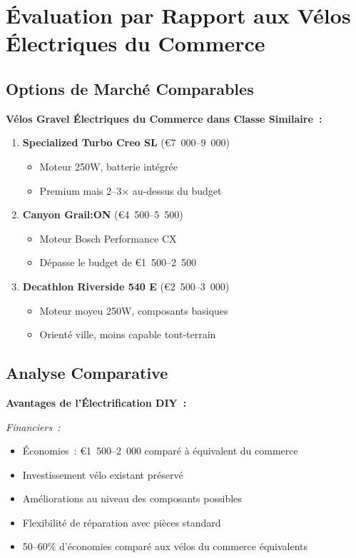 \documentclass[12pt,a4paper]{article}
\begin{document}
\section{Évaluation par Rapport aux Vélos Électriques du Commerce}

\subsection{Options de Marché Comparables}

\textbf{Vélos Gravel Électriques du Commerce dans Classe Similaire~:}

\begin{enumerate}
    \item \textbf{Specialized Turbo Creo SL} (€7~000--9~000) \cite{specialized-turbo}
    \begin{itemize}
        \item Moteur 250W, batterie intégrée
        \item Premium mais 2--3× au-dessus du budget
    \end{itemize}
    
    \item \textbf{Canyon Grail:ON} (€4~500--5~500) \cite{canyon-grail}
    \begin{itemize}
        \item Moteur Bosch Performance CX
        \item Dépasse le budget de €1~500--2~500
    \end{itemize}
    
    \item \textbf{Decathlon Riverside 540 E} (€2~500--3~000) \cite{decathlon-riverside}
    \begin{itemize}
        \item Moteur moyeu 250W, composants basiques
        \item Orienté ville, moins capable tout-terrain
    \end{itemize}
\end{enumerate}

\subsection{Analyse Comparative}

\textbf{Avantages de l'Électrification DIY~:}

\textit{Financiers~:}
\begin{itemize}
    \item Économies~: €1~500--2~000 comparé à équivalent du commerce
    \item Investissement vélo existant préservé
    \item Améliorations au niveau des composants possibles
    \item Flexibilité de réparation avec pièces standard
    \item 50--60\% d'économies comparé aux vélos du commerce équivalents
\end{itemize}
\end{document}
